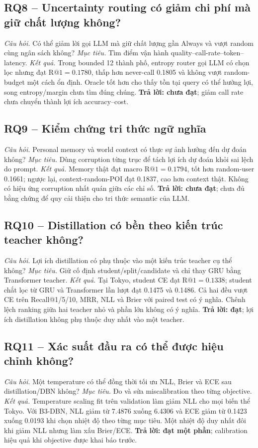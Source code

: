 \documentclass[runningheads]{llncs}
\makeatletter
\newcommand{\Rone}{\mathrm{R@1}}
\makeatother
\begin{document}
\subsection{RQ8 -- Uncertainty routing có giảm chi phí mà giữ chất lượng không?}
\textit{Câu hỏi.} Có thể giảm lời gọi LLM mà giữ chất lượng gần Always và vượt random cùng ngân sách không?
\textit{Mục tiêu.} Tìm điểm vận hành quality--call-rate--token--latency.
\textit{Kết quả.} Trong bounded 12 thành phố, entropy router gọi LLM có chọn lọc nhưng đạt $\Rone=0.1780$,
thấp hơn never-call 0.1805 và không vượt random-budget một cách ổn định. Oracle tốt hơn cho
thấy tồn tại query có thể hưởng lợi, song entropy/margin chưa tìm đúng chúng. \textbf{Trả lời:
chưa đạt}; giảm call rate chưa chuyển thành lợi ích accuracy--cost.

\subsection{RQ9 -- Kiểm chứng tri thức ngữ nghĩa}
\textit{Câu hỏi.} Personal memory và world context có thực sự ảnh hưởng đến dự đoán không?
\textit{Mục tiêu.} Dùng corruption từng trục để tách lợi ích dự đoán khỏi sai lệch do prompt.
\textit{Kết quả.} Memory thật đạt macro $\Rone=0.1794$, tốt hơn random-user 0.1661; ngược lại,
context-random-POI đạt 0.1837, cao hơn context thật. Không có hiệu ứng corruption nhất quán
giữa các chỉ số. \textbf{Trả lời: chưa đạt}; chưa đủ bằng chứng để quy cải thiện cho tri thức
semantic của LLM.

\subsection{RQ10 -- Distillation có bền theo kiến trúc teacher không?}
\textit{Câu hỏi.} Lợi ích distillation có phụ thuộc vào một kiến trúc teacher cụ thể không?
\textit{Mục tiêu.} Giữ cố định student/split/candidate và chỉ thay GRU bằng Transformer teacher.
\textit{Kết quả.} Tại Tokyo, student CE đạt $\Rone=0.1338$; student chắt lọc từ GRU và Transformer lần lượt
đạt 0.1475 và 0.1486. Cả hai đều vượt CE trên Recall@1/5/10, MRR, NLL và Brier với paired
test có ý nghĩa. Chênh lệch ranking giữa hai teacher nhỏ và phần lớn không có ý nghĩa.
\textbf{Trả lời: đạt}; lợi ích distillation không phụ thuộc duy nhất vào một teacher.

\subsection{RQ11 -- Xác suất đầu ra có thể được hiệu chỉnh không?}
\textit{Câu hỏi.} Một temperature có thể đồng thời tối ưu NLL, Brier và ECE sau distillation/DBN không?
\textit{Mục tiêu.} Đo và sửa miscalibration theo từng objective.
\textit{Kết quả.} Temperature scaling fit trên validation làm giảm NLL cho mọi biến thể Tokyo. Với B3-DBN,
NLL giảm từ 7.4876 xuống 6.4306 và ECE giảm từ 0.1423 xuống 0.0193 khi chọn nhiệt độ theo
từng mục tiêu. Một nhiệt độ duy nhất đôi khi giảm NLL nhưng làm xấu Brier/ECE.
\textbf{Trả lời: đạt một phần}; calibration hiệu quả khi objective được khai báo trước.
\end{document}
